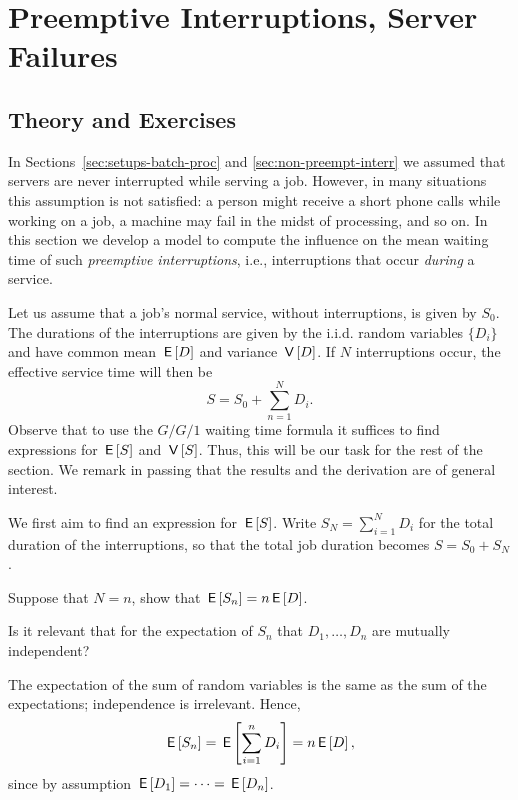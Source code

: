 \section{Preemptive Interruptions, Server Failures}
\label{sec:preempt-interr-serv}

\subsection*{Theory and Exercises}



In Sections~\ref{sec:setups-batch-proc} and \ref{sec:non-preempt-interr} we assumed that servers are never interrupted while serving a job.
However, in many situations this assumption is not satisfied: a person might receive a short phone calls while working on a job, a machine may fail in the midst of processing, and so on.
In this section we develop a model to compute the influence on the mean waiting time of such \emph{preemptive interruptions}, i.e., interruptions that occur \emph{during} a service. 

Let us assume that a job's normal service, without interruptions, is given by $S_0$. The durations of the interruptions are given by the i.i.d. random variables $\{D_i\}$ and have common mean $\,\mathsf{E}\left[D\right]$ and variance $\,\mathsf{V}\left[D\right]$. If $N$ interruptions occur, the effective service time will then be
\begin{equation*}
S= S_0 + \sum_{n=1}^N D_i.
\end{equation*}
Observe that to use the $G/G/1$ waiting time formula it suffices to find expressions for $\,\mathsf{E}\left[S\right]$ and $\,\mathsf{V}\left[S\right]$.
Thus, this will be our task for the rest of the section.
We remark in passing that the results and the derivation are of general interest.

We first aim to find an expression for $\,\mathsf{E}\left[S\right]$.  Write  $S_N = \sum_{i=1}^N D_i$ for the total duration of the interruptions, so that the total job duration becomes $S = S_0 + S_N$.

\begin{exercise}[\faFlask]
  Suppose that $N=n$, show that $\,\mathsf{E}\left[S_n\right]=n\,\mathsf{E}\left[D\right]$.
\begin{hint}
    Is it relevant that for the expectation of $S_n$ that $D_1,\ldots, D_n$ are mutually independent?
  \end{hint}
\begin{solution}
The expectation of the sum of random variables is the same as the sum of the expectations; independence is irrelevant. Hence,
\begin{equation*}
  \,\mathsf{E}\left[S_n \right] =  \,\mathsf{E}\left[\sum_{i=1}^n D_i\right]=  n \,\mathsf{E}\left[D\right], 
\end{equation*}
since by assumption $\,\mathsf{E}\left[D_1\right] = \cdots = \,\mathsf{E}\left[D_n\right]$. 
\end{solution}
\end{exercise}

